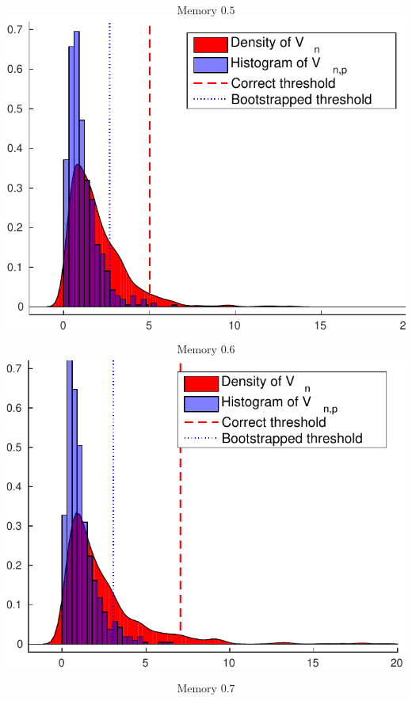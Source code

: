 \documentclass[landscape,a0]{a0poster_csml_v2}
\begin{document}
\begin{poster}
\begin{PosterColumn}
\begin{minipage}[c]{0.24\textwidth}
$$\text{Memory }0.5$$
\includegraphics[width=\textwidth]{../img/permfail_ecdf5.pdf} 
\end{minipage}
\begin{minipage}[c]{0.24\textwidth}
$$\text{Memory }0.6$$
\includegraphics[width=\textwidth]{../img/permfail_ecdf6.pdf} 
\end{minipage}
\begin{minipage}[c]{0.24\textwidth}
$$\text{Memory }0.7$$

\end{minipage}
\end{PosterColumn}
\end{poster}
\end{document}
